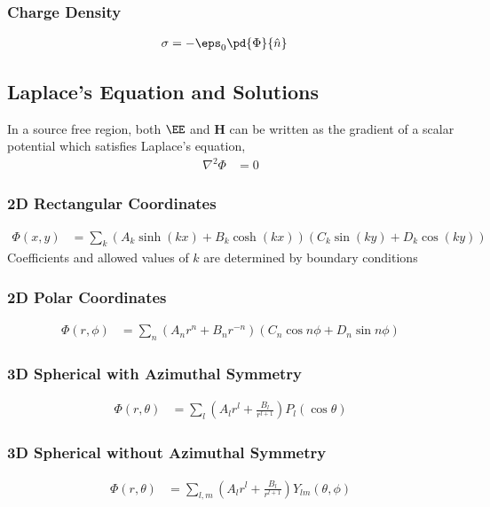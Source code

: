 \documentclass[11pt]{article}
\renewcommand{\HH}{\mathbf{H}}
\begin{document}
\subsubsection{Charge Density}
\label{sec:org061a651}
\begin{align*}
\sigma & = -\eps_0 \pd{\Phi}{\hat{n}}
\end{align*}

\subsection{Laplace's Equation and Solutions}
\label{sec:org1708958}
In a source free region, both \(\EE\) and \(\HH\) can be written as the gradient of a scalar potential which satisfies Laplace's equation,
\begin{align*}
\nabla^2 \Phi & = 0
\end{align*}
\subsubsection{2D Rectangular Coordinates}
\label{sec:orgbd3f542}
\begin{align*}
\Phi(x,y) & = \sum_k (A_k \sinh(kx) + B_k \cosh(kx)) (C_k \sin(ky) + D_k \cos(ky))
\end{align*}
Coefficients and allowed values of \(k\) are determined by boundary conditions
\subsubsection{2D Polar Coordinates}
\label{sec:org4b5ba68}
\begin{align*}
\Phi(r, \phi) & = \sum_n (A_n r^n + B_n r^{-n}) (C_n \cos n\phi + D_n \sin n\phi)
\end{align*}
\subsubsection{3D Spherical with Azimuthal Symmetry}
\label{sec:org2b71fa4}
\begin{align*}
\Phi(r, \theta) & = \sum_l \left( A_l r^l + \frac{B_l}{r^{l+1}} \right) P_l(\cos \theta)
\end{align*}
\subsubsection{3D Spherical without Azimuthal Symmetry}
\label{sec:org024c555}
\begin{align*}
\Phi(r, \theta) & = \sum_{l,m} \left( A_l r^l + \frac{B_l}{r^{l+1}} \right) Y_{lm}(\theta, \phi)
\end{align*}
\end{document}
